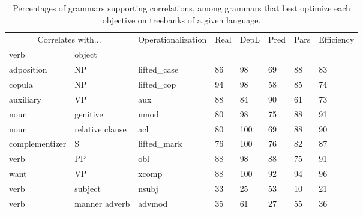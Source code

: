 \documentclass[12pt]{article}
\begin{document}
\begin{table}
	\begin{center}
\begin{tabular}{|ll|l|l|l|ll|l|}
	\hline
	\multicolumn{2}{|c|}{Correlates with...}   &          \multirow{2}{*}{Operationalization}       &     \multirow{2}{*}{Real}   & \multirow{2}{*}{DepL}  & \multirow{2}{*}{Pred}   &  \multirow{2}{*}{Pars} &  \multirow{2}{*}{Efficiency}  \\ 
	verb & object &      & & & &  & \\ \hline \hline %
adposition    &    NP    &    lifted\_case    &    86    &    98    &    69    &    88    &    83   \\
copula    &    NP    &    lifted\_cop    &    94    &    98    &    58    &    85    &    74   \\
auxiliary    &    VP    &    aux    &    88    &    84    &    90    &    61    &    73   \\
noun    &    genitive    &    nmod    &    80    &    98    &    75    &    88    &    91   \\
noun    &    relative clause    &    acl    &    80    &    100    &    69    &    88    &    90   \\
complementizer    &    S    &    lifted\_mark    &    76    &    100    &    76    &    82    &    87   \\
verb    &    PP    &    obl    &    88    &    98    &    88    &    75    &    91   \\
want    &    VP    &    xcomp    &    88    &    100    &    92    &    94    &    96   \\
verb    &    subject    &    nsubj    &    33    &    25    &    53    &    10    &    21   \\
verb    &    manner adverb    &    advmod    &    35    &    61    &    27    &    55    &    36   \\
 \hline
\end{tabular}
	\end{center}
	\caption{Percentages of grammars supporting correlations, among grammars that best optimize each objective on treebanks of a given language.}\label{table:results-dryer-best-only}
\end{table}
\end{document}
